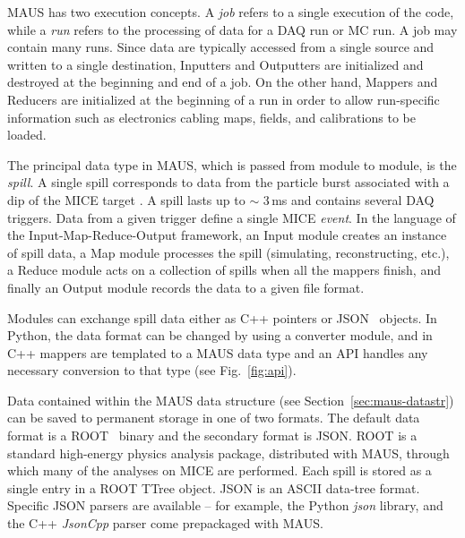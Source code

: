 \documentclass[11pt]{article}
\begin{document}
MAUS has two execution concepts. A \emph{job} refers to a single execution of the code, while a \emph{run} refers to the processing of data for a DAQ run or MC run. A job may contain many runs. Since data are typically accessed from a single source and written to a single destination, Inputters and Outputters are initialized and destroyed at the beginning and end of a job. On the other hand, Mappers and Reducers are initialized at the beginning of a run in order to allow run-specific information such as electronics cabling maps, fields, and calibrations to be loaded.

The principal data type in MAUS, which is passed from module to module, is the \emph{spill}. A single spill corresponds to  data from the particle burst associated with a dip of the MICE target \cite{BeamlineJINST}. A spill lasts up to $\sim$ 3\,ms and contains several DAQ triggers.  Data from a given trigger define a single MICE \emph{event}. In the language of the Input-Map-Reduce-Output framework, an Input module creates an instance of spill data, a Map module processes the spill (simulating, reconstructing, etc.), a Reduce module acts on a collection of spills when all the mappers finish, and finally an Output module records the data to a given file format.

Modules can exchange spill data either as C++ pointers or JSON~\cite{JSON} objects. In Python, the data format can be changed by using a converter module, and in C++ mappers are templated to a MAUS data type and an API  handles any necessary conversion to that type (see Fig.~\ref{fig:api}). 


Data contained within the MAUS data structure (see Section~\ref{sec:maus-datastr}) can be saved to permanent storage in one of two formats. The default data format is a ROOT~\cite{ROOT} binary and the secondary format is JSON. ROOT is a standard high-energy physics analysis package, distributed with MAUS, through which many of the analyses on MICE are performed. Each spill is stored as a single entry in a ROOT TTree object.  JSON is an ASCII data-tree format. Specific JSON parsers are available -- for example, the Python \emph{json} library, and the C++ \emph{JsonCpp} \cite{JSONCPP} parser come prepackaged with MAUS. 
\end{document}
